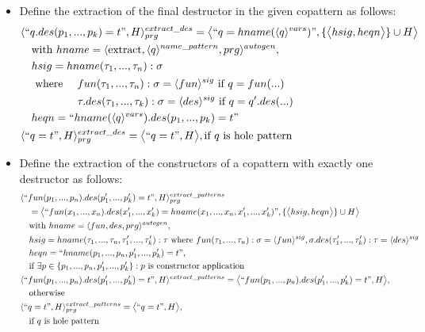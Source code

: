 \documentclass[11pt]{article} %
\begin{document}
\begin{itemize}
\item Define the extraction of the final destructor in the given copattern as follows:
\begin{alignat*}{2}
& \langle `` q.des(p_1, ..., p_k) = t ", H \rangle^{extract\_des}_{prg} = \big\langle `` q = hname(\langle q \rangle^{vars})  ", \{ \big\langle hsig, heqn \big\rangle \} \cup H \big\rangle \span\span \\
&\quad \textrm{with } hname = \langle \textrm{extract}, \langle q \rangle^{name\_pattern}, prg \rangle^{autogen}, \span\span \\
&\quad hsig = hname(\tau_1, ..., \tau_n): \sigma \span\span \\
&\quad \textrm{ where } && fun(\tau_1, ..., \tau_n): \sigma = \langle fun \rangle^{sig} \textrm{ if } q = fun(...)\\
&\quad && \tau.des(\tau_1, ..., \tau_k) : \sigma = \langle des \rangle^{sig} \textrm{ if } q = q'.des(...) \\
&\quad heqn = `` hname(\langle q \rangle^{vars}).des(p_1, ..., p_k) = t  " \span\span \\
& \langle `` q = t ", H \rangle^{extract\_des}_{prg} = \big\langle `` q = t ", H \big\rangle, \textrm{if $q$ is hole pattern} \span\span
\end{alignat*}

\item Define the extraction of the constructors of a copattern with exactly one destructor as follows:
\begin{alignat*}{3}
&\langle `` fun(p_1, ..., p_n).des(p'_1, ..., p'_k) = t ", H \rangle^{extract\_patterns}_{prg} \\
&\quad = \big\langle `` fun(x_1, ..., x_n).des(x'_1, ..., x'_k) = hname(x_1, ..., x_n, x'_1, ..., x'_k) ", \{\big\langle hsig, heqn \big\rangle\} \cup H \big\rangle \\
&\quad \textrm{with } hname= \langle fun, des, prg \rangle^{autogen}, \\
&\quad hsig = hname(\tau_1, ..., \tau_n, \tau'_1, ..., \tau'_k): \tau \textrm{ where } fun(\tau_1, ..., \tau_n): \sigma = \langle fun \rangle^{sig}, \sigma.des(\tau'_1, ..., \tau'_k): \tau = \langle des \rangle^{sig} \\
&\quad heqn = `` hname(p_1, ..., p_n, p'_1, ..., p'_k) = t ", \\
&\quad \textrm{if } \exists p \in \{p_1, ..., p_n, p'_1, ..., p'_k\}: p \textrm{ is constructor application} \\
&\langle `` fun(p_1, ..., p_n).des(p'_1, ..., p'_k) = t ", H \rangle^{extract\_patterns} = \big\langle `` fun(p_1, ..., p_n).des(p'_1, ..., p'_k) = t ", H \big\rangle, \\
&\quad \textrm{otherwise} \\
&\langle `` q = t ", H \rangle^{extract\_patterns}_{prg} = \big\langle `` q = t ", H \big\rangle, \\
&\quad \textrm{if $q$ is hole pattern}
\end{alignat*}


\end{itemize}
\end{document}
